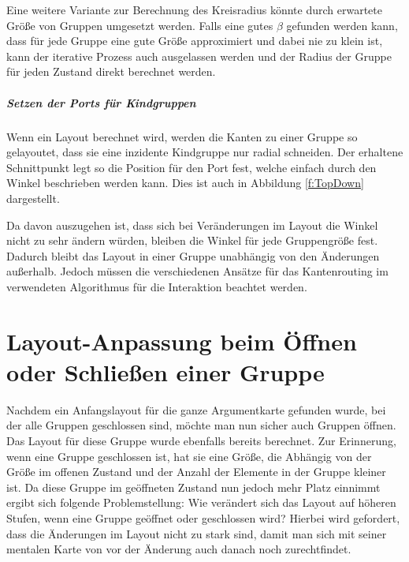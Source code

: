 Eine weitere Variante zur Berechnung des Kreisradius könnte durch erwartete Größe von Gruppen umgesetzt werden. 
Falls eine gutes $\beta$ gefunden werden kann, dass für jede Gruppe eine gute Größe approximiert und dabei nie zu klein ist, kann der iterative Prozess auch ausgelassen werden
und der Radius der Gruppe für jeden Zustand direkt berechnet werden.

		
							



\subparagraph{Setzen der Ports für Kindgruppen}
Wenn ein Layout berechnet wird, werden die Kanten zu einer Gruppe so gelayoutet, dass sie eine inzidente Kindgruppe nur radial schneiden.
Der erhaltene Schnittpunkt legt so die Position für den Port fest, welche einfach durch den Winkel beschrieben werden kann. 
Dies ist auch in Abbildung  \ref{f:TopDown} dargestellt.

Da davon auszugehen ist, dass sich bei Veränderungen im Layout die Winkel nicht zu sehr ändern würden, bleiben die Winkel für jede Gruppengröße fest.
Dadurch bleibt das Layout in einer Gruppe unabhängig von den Änderungen außerhalb. 
Jedoch müssen die verschiedenen Ansätze für das Kantenrouting im verwendeten Algorithmus für die Interaktion beachtet werden.




\section{Layout-Anpassung beim Öffnen oder Schließen einer Gruppe}
Nachdem ein Anfangslayout für die ganze Argumentkarte gefunden wurde, bei der alle Gruppen geschlossen sind, möchte man nun sicher auch Gruppen öffnen. 
Das Layout für diese Gruppe wurde ebenfalls bereits berechnet. Zur Erinnerung, wenn eine Gruppe geschlossen ist, hat sie eine Größe, 
die Abhängig von der Größe im offenen Zustand und der Anzahl der Elemente in der Gruppe kleiner ist. 
Da diese Gruppe im geöffneten Zustand nun jedoch mehr Platz einnimmt ergibt sich folgende Problemstellung:
Wie verändert sich das Layout auf höheren Stufen, wenn eine Gruppe geöffnet oder geschlossen wird? 
Hierbei wird gefordert, dass die Änderungen im Layout nicht zu stark sind, damit man sich mit seiner mentalen Karte von vor der Änderung auch danach noch zurechtfindet.


